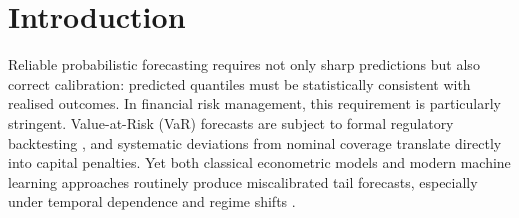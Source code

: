 \documentclass[preprint,11pt,authoryear]{elsarticle}
\newcommand{\1}{\boldsymbol{1}}
\begin{document}
\begin{frontmatter}
\begin{abstract}
			The framework is evaluated on five time series foundation models and four classical benchmarks across 24 financial assets over 2000--2026. Conformal recalibration empirically restores nominal coverage across a wide range of model--asset combinations (86.6\% Basel Green Zone with the static split; near-full compliance with the rolling variant), revealing a calibration--efficiency trade-off. The results establish that forecast validity can be separated from forecast generation: a one-parameter, distribution-free post-processing layer empirically restores tail coverage without modifying the underlying predictive model.

			\bigskip\noindent
			\textbf{Keywords:} Conformal prediction; probabilistic forecast calibration; Value at Risk; time series foundation models; distribution-free recalibration; temporal dependence; quantile score

			\bigskip\noindent
			\textbf{JEL:} C14\,|\,C53\,|\,C58\,|\,G17\,|\,G32
		\end{abstract}
		
	\end{frontmatter}
	
	\section{Introduction}
	\label{sec:intro}

	Reliable probabilistic forecasting requires not only sharp predictions but also correct calibration: predicted quantiles must be statistically consistent with realised outcomes. In financial risk management, this requirement is particularly stringent. Value-at-Risk (VaR) forecasts are subject to formal regulatory backtesting \citep{basel1996}, and systematic deviations from nominal coverage translate directly into capital penalties. Yet both classical econometric models and modern machine learning approaches routinely produce miscalibrated tail forecasts, especially under temporal dependence and regime shifts \citep{christoffersen1998, nolde2017elicitability, goel2024tsfmvar, pele2025llmvar}.
\end{document}

